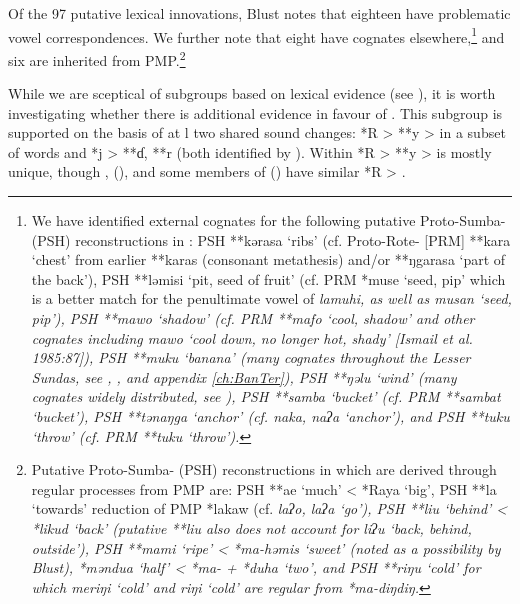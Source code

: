 Of the 97 putative lexical innovations,
Blust notes that eighteen have problematic vowel correspondences.
We further note that eight have cognates elsewhere,\footnote{
		We have identified external cognates %
		for the following
		putative Proto-Sumba- (PSH) reconstructions in \citet[109--111]{Blust2008}:
		PSH **kərasa ‘ribs’ (cf.
		Proto-Rote- **kara ‘chest’ from earlier **karas (consonant
		metathesis) and/or **ŋgarasa ‘part of the back’),
		PSH **ləmisi ‘pit, seed of fruit’ (cf.
		PRM *muse ‘seed, pip’ which is a better match for the penultimate
		vowel of  \it{lamuhi},
		as well as  \it{musan} ‘seed,
		pip’), PSH **mawo ‘shadow’ (cf.
		PRM **mafo ‘cool, shadow’ and other cognates including
		 \it{mawo} ‘cool down,
		no longer hot, shady’ [Ismail et al.
		1985:87]), PSH **muku ‘banana’ (many cognates throughout the
		Lesser Sundas, see , , and appendix
		\ref{ch:BanTer}), PSH **ŋəlu ‘wind’ (many cognates widely distributed,
		see ), PSH **samba ‘bucket’ (cf.
		PRM **sambat ‘bucket’), PSH **tənaŋga ‘anchor’ (cf.
		 \it{naka},  \it{naʔa} ‘anchor’), and PSH **tuku ‘throw’ (cf.
		PRM **tuku ‘throw’).} 
and six are inherited from PMP.\footnote{
		Putative Proto-Sumba-
		(PSH) reconstructions in \citet[109--111]{Blust2008} which are
		derived through regular processes from PMP are: PSH **ae ‘much’
		< *Raya ‘big’, PSH **la ‘towards’ reduction of PMP *lakaw (cf.
		 \it{laʔo}, \it{laʔa} ‘go’),
		PSH **liu ‘behind’ < *likud ‘back’ (putative **liu also does
		not account for  \it{liʔu} ‘back,
		behind, outside’), PSH **mami ‘ripe’ < *ma-həmis ‘sweet’ (noted
		as a possibility by Blust),
		*məndua ‘half’ < *ma- + *duha ‘two’,
		and PSH **riŋu ‘cold’ for which  \it{meriŋi} ‘cold’
		and  \it{riŋi} ‘cold’ are regular from *ma-diŋdiŋ.}

\largerpage
While we are sceptical of subgroups based on lexical evidence
(see ),
it is worth investigating whether there is
additional evidence in favour of .
This subgroup is supported on the basis of at l
two shared sound changes: *R > **y > {\0} in a subset of words
and *j > **ɗ, **r (both identified by \citealp[93--94]{Blust2008}).
Within 
*R > **y > {\0} is mostly unique,
though ,  (),
and some members of  () have similar *R > {\0}.


